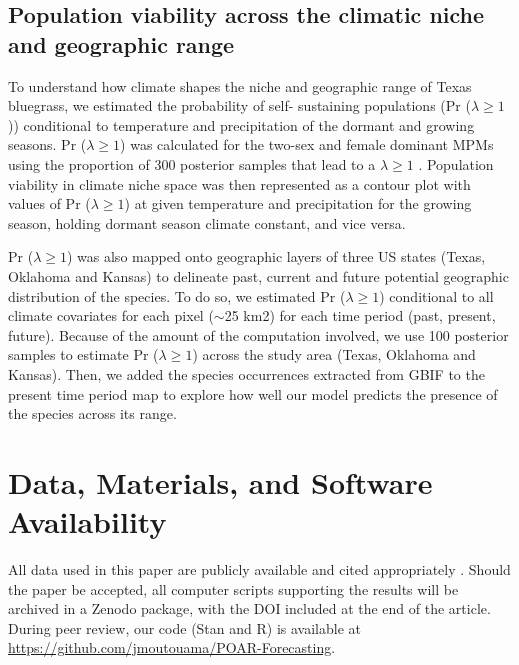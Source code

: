 \documentclass[9pt,twocolumn,twoside,lineno]{pnas-new}
\newcommand{\tom}[2]{{\color{red}{#1}}\footnote{\textit{\color{red}{#2}}}}
\begin{document}
\subsection*{Population viability across the climatic niche and geographic range}
To understand how climate shapes the niche and geographic range of Texas bluegrass, we estimated the probability of self- sustaining populations (Pr ($\lambda \ge 1$)) conditional to temperature and precipitation of the dormant and growing seasons.
Pr ($\lambda \ge 1$) was calculated for the two-sex and female dominant MPMs using the proportion of 300 posterior samples that lead to a $\lambda \ge 1$ \citep{diez2014probabilistic}.
Population viability in climate niche space was then represented as a contour plot with values of Pr ($\lambda \ge 1$) at given temperature and precipitation for the growing season, holding dormant season climate constant, and vice versa. 

Pr ($\lambda \ge 1$) was also mapped onto geographic layers of three US states (Texas, Oklahoma and Kansas) to delineate past, current and future potential geographic distribution of the species.
To do so, we estimated Pr ($\lambda \ge 1$) conditional to all climate covariates for each pixel ($\sim$25 km2) for each time period (past, present, future).
Because of the amount of the computation involved, we use 100 posterior samples to estimate Pr ($\lambda \ge 1$) across the study area (Texas, Oklahoma and Kansas).
Then, we added the species occurrences extracted from GBIF to the present time period map to explore how well our model predicts the presence of the species across its range.


\showmatmethods{} %

\section*{Data, Materials, and Software Availability}
All data used in this paper are  publicly available and cited appropriately \citep{dryaddata}. 
Should the paper be accepted, all computer scripts supporting the results will be archived in a Zenodo package, with the DOI included at the end of the article. 
During peer review, our code (Stan and R) is available at \url{https://github.com/jmoutouama/POAR-Forecasting}. 
\end{document}

